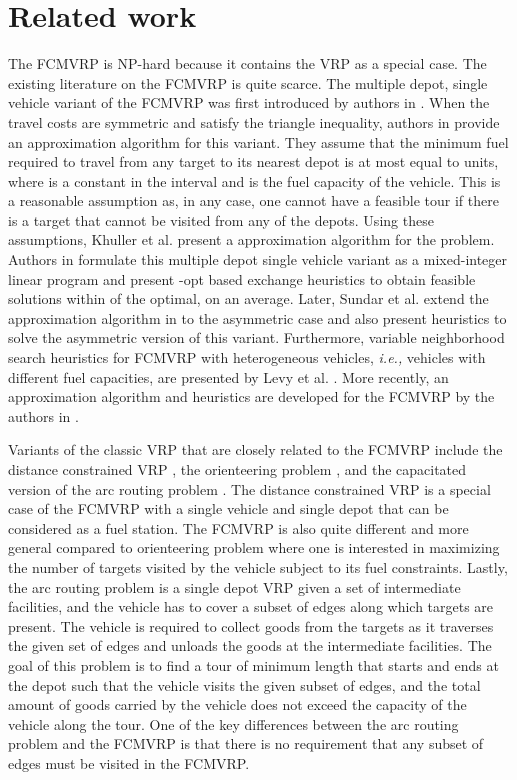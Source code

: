 \documentclass[letterpaper, 10pt, conference]{ieeeconf}
\begin{document}
\section{Related work \label{sec:litreview}} 
The FCMVRP is NP-hard because it contains the VRP as a special case. The existing literature on the FCMVRP is quite scarce. The multiple depot, single vehicle variant of the FCMVRP was first introduced by authors in \cite{Khuller2007}. When the travel costs are symmetric and satisfy the triangle inequality, authors in \cite{Khuller2007} provide an approximation algorithm for this variant. They assume that the minimum fuel required to travel from any target to its nearest depot is at most equal to  units, where  is a constant in the interval  and  is the fuel capacity of the vehicle. This is a reasonable assumption as, in any case, one cannot have a feasible tour if there is a target that cannot be visited from any of the depots. Using these assumptions, Khuller et al. \cite{Khuller2007} present a  approximation algorithm for the problem. Authors in \cite{Sundar2012} formulate this multiple depot single vehicle variant as a mixed-integer linear program and present -opt based exchange heuristics to obtain feasible solutions within  of the optimal, on an average. Later, Sundar et al. \cite{Sundar2014} extend the approximation algorithm in  to the asymmetric case and also present heuristics to solve the asymmetric version of this variant. Furthermore, variable neighborhood search heuristics for FCMVRP with heterogeneous vehicles, \emph{i.e.,} vehicles with different fuel capacities, are presented by Levy et al. \cite{Levy2014}. More recently, an approximation algorithm and heuristics are developed for the FCMVRP by the authors in \cite{Mitchell2015}.

Variants of the classic VRP that are closely related to the FCMVRP include the distance constrained VRP \cite{Laporte1984, Li1992, Kara2010, Kara2011, Nagarajan2012}, the orienteering problem \cite{Fischetti1998, Vansteenwegen2011}, and the capacitated version of the arc routing problem \cite{Ghiani2004, Polacek2008}. The distance constrained VRP is a special case of the FCMVRP with a single vehicle and single depot that can be considered as a fuel station. The FCMVRP is also quite different and more general compared to orienteering problem where one is interested in maximizing the number of targets visited by the vehicle subject to its fuel constraints. Lastly, the arc routing problem is a single depot VRP given a set of intermediate facilities, and the vehicle has to cover a subset of edges along which targets are present. The vehicle is required to collect goods from the targets as it traverses the given set of edges and unloads the goods at the intermediate facilities. The goal of this problem is to find a tour of minimum length that starts and ends at the depot such that the vehicle visits the given subset of edges, and the total amount of goods carried by the vehicle does not exceed the capacity of the vehicle along the tour. One of the key differences between the arc routing problem and the FCMVRP is that there is no requirement that any subset of edges must be visited in the FCMVRP.
\end{document}
